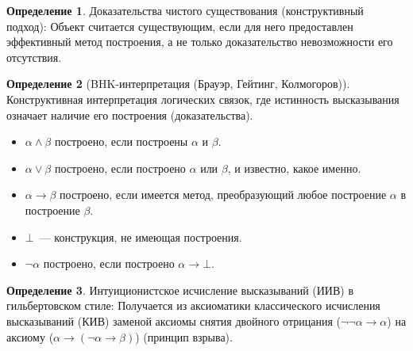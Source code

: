 \documentclass[a4paper,11pt]{article}
\theoremstyle{definition}
\newtheorem*{dfn}{Определение}
\begin{document}
\begin{dfn}
Доказательства чистого существования (конструктивный подход): Объект считается
существующим, если для него предоставлен эффективный метод построения, а не
только доказательство невозможности его отсутствия.
\end{dfn}
\begin{dfn}[BHK-интерпретация (Брауэр, Гейтинг, Колмогоров)]
Конструктивная интерпретация логических связок, где истинность высказывания
означает наличие его построения (доказательства).
\begin{itemize}
\item $\alpha \wedge \beta$ построено, если построены $\alpha$ и $\beta$.
\item $\alpha \vee \beta$ построено, если построено $\alpha$ или $\beta$, и
  известно, какое именно.
\item $\alpha \to \beta$ построено, если имеется метод, преобразующий любое
  построение $\alpha$ в построение $\beta$.
\item $\bot$~--- конструкция, не имеющая построения.
\item $\neg\alpha$ построено, если построено $\alpha \to \bot$.
\end{itemize}
\end{dfn}
\begin{dfn}
Интуиционистское исчисление высказываний (ИИВ) в гильбертовском стиле:
Получается из аксиоматики классического исчисления высказываний (КИВ) заменой
аксиомы снятия двойного отрицания ($\neg\neg\alpha \to \alpha$) на аксиому
($\alpha \to (\neg\alpha \to \beta)$) (принцип взрыва).
\end{dfn}
\end{document}

